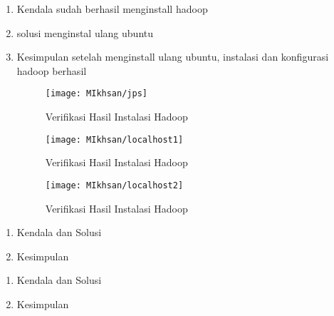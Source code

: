 
\begin{enumerate}
\item Kendala
\newline 
sudah berhasil menginstall hadoop

\item solusi
\newline
menginstal ulang ubuntu

\item Kesimpulan
\newline
setelah menginstall ulang ubuntu, instalasi dan konfigurasi hadoop berhasil

\begin{figure}[!ht]
\texttt{[image: MIkhsan/jps]}
\caption{Verifikasi Hasil Instalasi Hadoop}
\label{gam:Java-version(MIkhsan)}
\end{figure} 

\begin{figure}[!ht]
\texttt{[image: MIkhsan/localhost1]}
\caption{Verifikasi Hasil Instalasi Hadoop}
\label{gam:Java-version(MIkhsan)}
\end{figure} 

\begin{figure}[!ht]
\texttt{[image: MIkhsan/localhost2]}
\caption{Verifikasi Hasil Instalasi Hadoop}
\label{gam:Hadoop-version(MIkhsan)}
\end{figure}

\end{enumerate}


\begin{enumerate}
\item Kendala dan Solusi

\item Kesimpulan

\end{enumerate}

\begin{enumerate}
\item Kendala dan Solusi

\item Kesimpulan

\end{enumerate}


